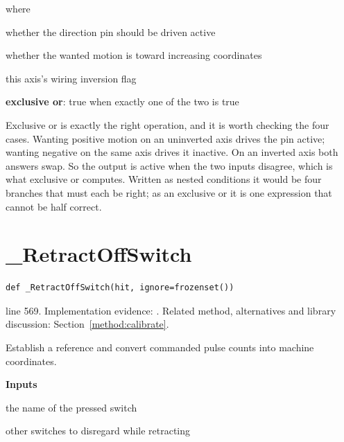 \noindent where
\begin{description}[leftmargin=2.4em,style=nextline,font=\normalfont\ttfamily]\setlength\itemsep{1pt}
  \item[{$\mathrm{forward}$}] \normalfont whether the direction pin should be driven active
  \item[{$\mathrm{positive}$}] \normalfont whether the wanted motion is toward increasing coordinates
  \item[{$\mathrm{invert}$}] \normalfont this axis's wiring inversion flag
  \item[{$\oplus$}] \normalfont \textbf{exclusive or}: true when exactly one of the two is true
\end{description}
Exclusive or is exactly the right operation, and it is worth checking the four cases. Wanting positive motion on an uninverted axis drives the pin active; wanting negative on the same axis drives it inactive. On an inverted axis both answers swap. So the output is active when the two inputs disagree, which is what exclusive or computes. Written as nested conditions it would be four branches that must each be right; as an exclusive or it is one expression that cannot be half correct.



\section{\_RetractOffSwitch}\label{fn:reproduce:-RetractOffSwitch}
\begin{lstlisting}[style=sig]
def _RetractOffSwitch(hit, ignore=frozenset())
\end{lstlisting}
 line 569. Implementation evidence: \cite{code2026}. Related method, alternatives and library discussion: Section~\ref{method:calibrate}.


Establish a reference and convert commanded pulse counts into machine coordinates.




\noindent\textbf{Inputs}
\begin{description}[leftmargin=2.2em,style=nextline,font=\normalfont\ttfamily]\setlength\itemsep{1pt}
  \item[{hit}] \normalfont the name of the pressed switch
  \item[{ignore}] \normalfont other switches to disregard while retracting
\end{description}

